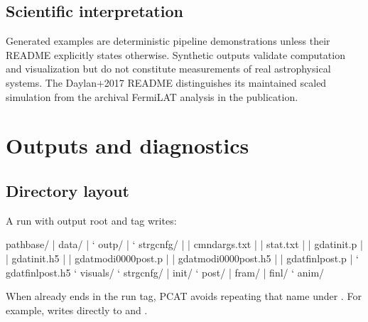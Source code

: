 \documentclass[letterpaper,10pt,english]{sphinxmanual}
\begin{document}
\section{Scientific interpretation}
\label{\detokenize{examples:scientific-interpretation}}
\sphinxAtStartPar
Generated examples are deterministic pipeline demonstrations unless their
README explicitly states otherwise. Synthetic outputs validate computation and
visualization but do not constitute measurements of real astrophysical systems.
The Daylan+2017 README distinguishes its maintained scaled simulation from the
archival Fermi\sphinxhyphen{}LAT analysis in the publication.

\sphinxstepscope


\chapter{Outputs and diagnostics}
\label{\detokenize{outputs:outputs-and-diagnostics}}\label{\detokenize{outputs::doc}}

\section{Directory layout}
\label{\detokenize{outputs:directory-layout}}
\sphinxAtStartPar
A run with output root  and tag  writes:

\begin{sphinxVerbatim}[commandchars=\\\{\}]
pathbase/
|\PYGZhy{}\PYGZhy{} data/
|   `\PYGZhy{}\PYGZhy{} outp/
|       `\PYGZhy{}\PYGZhy{} strgcnfg/
|           |\PYGZhy{}\PYGZhy{} cmndargs.txt
|           |\PYGZhy{}\PYGZhy{} stat.txt
|           |\PYGZhy{}\PYGZhy{} gdatinit.p
|           |\PYGZhy{}\PYGZhy{} gdatinit.h5
|           |\PYGZhy{}\PYGZhy{} gdatmodi0000post.p
|           |\PYGZhy{}\PYGZhy{} gdatmodi0000post.h5
|           |\PYGZhy{}\PYGZhy{} gdatfinlpost.p
|           `\PYGZhy{}\PYGZhy{} gdatfinlpost.h5
`\PYGZhy{}\PYGZhy{} visuals/
    `\PYGZhy{}\PYGZhy{} strgcnfg/
        |\PYGZhy{}\PYGZhy{} init/
        `\PYGZhy{}\PYGZhy{} post/
            |\PYGZhy{}\PYGZhy{} fram/
            |\PYGZhy{}\PYGZhy{} finl/
            `\PYGZhy{}\PYGZhy{} anim/
\end{sphinxVerbatim}

\sphinxAtStartPar
When  already ends in the run tag, PCAT avoids repeating that name
under . For example,  writes directly to
 and .
\end{document}

